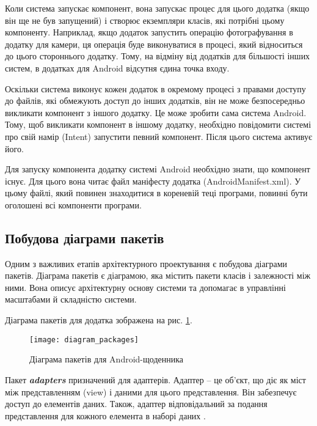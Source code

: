 \documentclass[../main.tex]{subfiles}
\begin{document}
Коли система запускає компонент, вона запускає процес для цього додатка (якщо він ще не був запущений) і створює екземпляри класів, які потрібні цьому компоненту. Наприклад, якщо додаток запустить операцію фотографування в додатку для камери, ця операція буде виконуватися в процесі, який відноситься до цього стороннього додатку. Тому, на відміну від додатків для більшості інших систем, в додатках для Android відсутня єдина точка входу.

Оскільки система виконує кожен додаток в окремому процесі з правами доступу до файлів, які обмежують доступ до інших додатків, він не може безпосередньо викликати компонент з іншого додатку. Це може зробити сама система Android. Тому, щоб викликати компонент в іншому додатку, необхідно повідомити системі про свій намір (Intent) запустити певний компонент. Після цього система активує його.

Для запуску компонента додатку системі Android необхідно знати, що компонент існує. Для цього вона читає файл маніфесту додатка (AndroidManifest.xml). У цьому файлі, який повинен знаходитися в кореневій теці програми, повинні бути оголошені всі компоненти програми.


\subsection{Побудова діаграми пакетів}
Одним з важливих етапів архітектурного проектування є побудова діаграми пакетів. Діаграма пакетів є діаграмою, яка містить пакети класів і залежності між ними. Вона описує архітектурну основу системи та допомагає в управлінні масштабами й складністю системи. 

Діаграма пакетів для додатка зображена на рис. \ref{diagram:packages}.
\vspace{\baselineskip}

\begin{figure}[H]
	\centering
	\texttt{[image: diagram\_packages]}
	\caption{Діаграма пакетів для Android-щоденника}
	\label{diagram:packages}
\end{figure}

Пакет \textit{\textbf{adapters}} призначений для адаптерів. Адаптер -- це об'єкт, що діє як міст між представленням (view) і даними для цього представлення. Він забезпечує доступ до елементів даних. Також, адаптер відповідальний за подання представлення для кожного елемента в наборі даних \cite{adapter}. 
\end{document}
